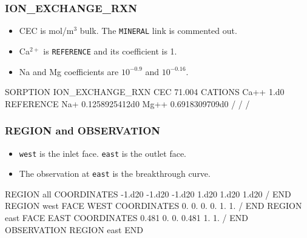 \documentclass{beamer}
\begin{document}
\begin{frame}[fragile]\frametitle{ION\_EXCHANGE\_RXN}

\begin{itemize}
  \item CEC is mol/m$^3$ bulk. The \texttt{MINERAL} link is commented out.
  \item Ca$^{2+}$ is \texttt{REFERENCE} and its coefficient is 1.
  \item Na and Mg coefficients are $10^{-0.9}$ and $10^{-0.16}$.
\end{itemize}

\begin{semiverbatim}
  SORPTION
    ION_EXCHANGE_RXN
      CEC 71.004
      CATIONS
        Ca++  1.d0 REFERENCE
        Na+   0.1258925412d0
        Mg++  0.6918309709d0
      /
    /
  /
\end{semiverbatim}

\end{frame}

\begin{frame}[fragile]\frametitle{REGION and OBSERVATION}

\begin{itemize}
  \item \texttt{west} is the inlet face. \texttt{east} is the outlet face.
  \item The observation at \texttt{east} is the breakthrough curve.
\end{itemize}

\tiny
\begin{semiverbatim}
REGION all
  COORDINATES
    -1.d20 -1.d20 -1.d20
    1.d20 1.d20 1.d20
  /
END
REGION west
  FACE WEST
  COORDINATES
    0. 0. 0.
    0. 1. 1.
  /
END
REGION east
  FACE EAST
  COORDINATES
    0.481 0. 0.
    0.481 1. 1.
  /
END
OBSERVATION
  REGION east
END
\end{semiverbatim}

\end{frame}
\end{document}
